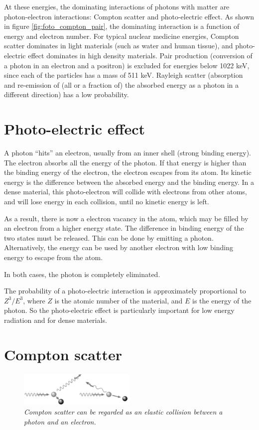 \documentclass[11pt,oneside]{book}
\begin{document}
At these energies, the dominating interactions of photons with matter are
photon-electron interactions: Compton scatter and photo-electric effect. As
shown in figure \ref{fig:foto_compton_pair}, the dominating interaction is a
function of energy and electron number. For typical nuclear medicine
energies, Compton scatter dominates in light materials (such as water and
human tissue), and photo-electric effect dominates in high density materials.
Pair production (conversion of a photon in an electron and a positron) is
excluded for energies below 1022 keV, since each of the particles has a mass
of 511 keV. Rayleigh scatter (absorption and re-emission of (all or a
fraction of) the absorbed energy as a photon in a different direction) has a
low probability.

\section{Photo-electric effect}
A photon ``hits'' an electron, usually from an inner shell (strong
binding energy). The electron absorbs all the energy of the photon. If
that energy is higher than the binding energy of the electron, the
electron escapes from its atom. Its kinetic energy is the difference
between the absorbed energy and the binding energy. In a dense
material, this photo-electron will collide with electrons from other
atoms, and will lose energy in each collision, until no kinetic energy
is left.

As a result, there is now a electron vacancy in the atom, which may be filled
by an electron from a higher energy state. The difference in binding energy
of the two states must be released. This can be done by emitting a photon.
Alternatively, the energy can be used by another electron with low binding
energy to escape from the atom.

In both cases, the photon is completely eliminated.

The probability of a photo-electric interaction is approximately proportional
to $Z^3 / E^3$, where $Z$ is the atomic number of the material, and $E$ is the
energy of the photon. So the photo-electric effect is particularly important for
low energy radiation and for dense materials.

\section{Compton scatter} \label{sec:compton_scatter}
\begin{figure}[tb]
\centering
\includegraphics[width=0.5\textwidth]{figs/fig_compton_scatter.pdf}
\caption{\label{fig:compton_scatter} \emph{Compton scatter can be regarded as
an elastic collision between a photon and an electron.}}
\end{figure}
\end{document}
